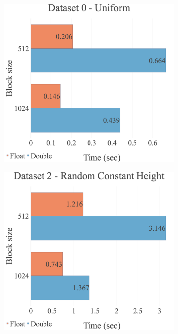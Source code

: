 \begin{figure}[H]
\centering
\begin{subfigure}{.49\textwidth}
  \centering
  \includegraphics[width=1\linewidth]{img/experiments/multi-blocks-0_UNIFORM.png}
\end{subfigure}
\begin{subfigure}{.49\textwidth}
  \centering
  \includegraphics[width=1\linewidth]{img/experiments/multi-blocks-2_RANDCONSTHEIGHT.png}

\end{subfigure}
\end{figure}
